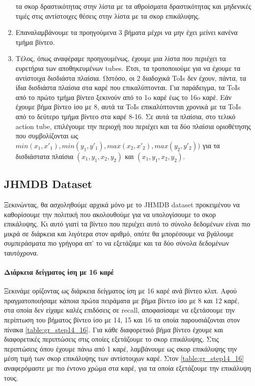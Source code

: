 \begin{enumerate}
  τα σκορ δραστικότητας στην λίστα με τα αθροίσματα δραστικότητας και μηδενικές τιμές στις αντίστοιχες θέσεις στην λίστα
  με τα σκορ επικάλυψης.
\item Επαναλαμβάνουμε τα προηγούμενα 3 βήματα μέχρι να μην έχει μείνει κανένα τμήμα βίντεο.
\item Τέλος, όπως αναφέραμε προηγουμένως, έχουμε μια λίστα που περιέχει τα ευρετήρια των αποθηκευμένων \en tubes\gr. Έτσι,
  τα τροποποιούμε  για να έχουμε  τα αντίστοιχα δισδιάστα πλαίσια. Ωστόσο, οι 2 διαδοχικά \en ToIs \gr δεν έχουν, πάντα,
  τα ίδια δισδιάστα πλαίσια  στα καρέ  που επικαλύπτονται. Για παράδειγμα, τα \en ToIs \gr από το πρώτο τμήμα βίντεο  ξεκινούν
  από το 1o καρέ έως το 16o καρέ. Εάν  έχουμε βήμα βίντεο ίσο με 8, αυτά τα \en ToIs \gr επικαλύπτονται χρονικά με  τα \en ToIs \gr
  από το δεύτερο τμήμα βίντεο στα καρέ 8-16. Σε αυτά τα πλαίσια, στο τελικό \en action tube\gr,
  επιλέγουμε την περιοχή που περιέχει και τα δύο πλαίσια οριοθέτησης που συμβολίζονται 
  ως $min(x_1,x'_1), min(y_1,y'_1), max(x_2,x'_2), max(y_2,y'_2))$ για τα δισδιάστατα πλαίσια $(x_1,y_1,x_2,y_2)$ και $(x_1,y_1,x_2,y_2)$.
\end{enumerate}

\subsection{\en JHMDB Dataset\gr}
Ξεκινώντας, θα ασχοληθούμε αρχικά μόνο με το \en JHMDB dataset  \gr προκειμένου να καθορίσουμε την πολιτική που ακολουθούμε για να υπολογίσουμε
το σκορ επικάλυψης. Kι αυτό γιατί τα βίντεο που περιέχει αυτό το σύνολο δεδομένων είναι πιο μικρά σε διάρκεια και λιγότερα στον αριθμό, οπότε
θα μπορέσουμε να βγάλουμε συμπεράσματα πιο γρήγορα απ' το να εξετάζαμε και τα δύο σύνολα δεδομένων ταυτόχρονα.

\paragraph{\gr Διάρκεια δείγματος ίση με  16 καρέ}
Ξεκινάμε ορίζοντας ως διάρκεια δείγματος ίση με 16 καρέ ανά βίντεο κλιπ. Αφού πραγματοποιήσαμε κάποια πρώτα πειράματα με βήμα βίντεο
ίσο με 8 και 12 καρέ, στα οποία δεν είχαμε καλές επιδόσεις σε \en recall\gr, αποφασίσαμε να εξετάσουμε την περίπτωση
του βήματος βίντεο ίσο με 14, 15 και 16 τα οποία παρουσιάζονται στον πίνακα \ref{table:gr_step14_16}. Για κάθε διαφορετικό βήμα βίντεο
έχουμε και διαφορετικές περιπτώσεις στις οποίες εξετάζουμε το σκορ επικάλυψης. Στις περιπτώσεις όπου έχουμε πάνω από 1 καρέ, λαμβάνουμε ως
σκορ επικάλυψης την μέση τιμή των σκορ επικάλυψης των αντίστοιχων καρέ. Στον \ref{table:gr_step14_16} αναφερόμαστε με πιο έντονο χρώμα στα καρέ, για τα οποία εξετάζουμε
την επικάλυψη τους.

